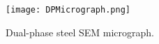 \begin{figure}[H]
\centering
  \texttt{[image: DPMicrograph.png]}
  \caption{Dual-phase steel SEM micrograph.}
  \label{fig:DPMicrostructure}
\end{figure}

%
%


%
%
%
%
%

